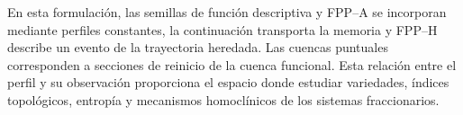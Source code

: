 En esta formulación, las semillas de función descriptiva y FPP--A se
incorporan mediante perfiles constantes, la continuación transporta la memoria
y FPP--H describe un evento de la trayectoria heredada. Las cuencas puntuales
corresponden a secciones de reinicio de la cuenca funcional. Esta relación
entre el perfil y su observación proporciona el espacio donde estudiar
variedades, índices topológicos, entropía y mecanismos homoclínicos de los
sistemas fraccionarios.
\fi
